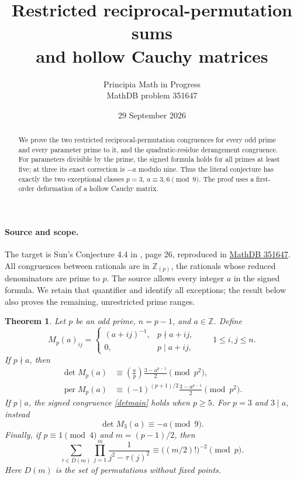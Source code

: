 \documentclass[11pt]{article}
\title{Restricted reciprocal-permutation sums\\
and hollow Cauchy matrices}
\author{Principia Math in Progress\\MathDB problem 351647}
\date{29 September 2026}
\newtheorem{theorem}{Theorem}
\DeclareMathOperator{\per}{per}
\newcommand{\Zp}{\mathbb Z_{(p)}}
\begin{document}
\maketitle
\begin{abstract}
We prove the two restricted reciprocal-permutation congruences for every
odd prime and every parameter prime to it, and the quadratic-residue
derangement congruence. For parameters divisible by the prime, the signed
formula holds for all primes at least five; at three its exact correction
is $-a$ modulo nine. Thus the literal conjecture has exactly the two
exceptional classes $p=3$, $a\equiv3,6\pmod9$. The proof uses a first-order
deformation of a hollow Cauchy matrix.
\end{abstract}

\paragraph{Source and scope.}
The target is Sun's Conjecture 4.4 in \cite{Sun}, page 26, reproduced in
\href{https://mathdb.com/p/351647}{MathDB 351647}. All congruences between
rationals are in $\Zp$, the rationals whose reduced denominators are
prime to $p$. The source allows every integer $a$ in the signed formula.
We retain that quantifier and identify all exceptions; the result below
also proves the remaining, unrestricted prime ranges.

\begin{theorem}\label{main}
Let $p$ be an odd prime, $n=p-1$, and $a\in\mathbb Z$. Define
\[
 M_p(a)_{ij}=
 \begin{cases}(a+ij)^{-1},&p\nmid a+ij,\\0,&p\mid a+ij,\end{cases}
 \qquad 1\leq i,j\leq n .
\]
If $p\nmid a$, then
\begin{align}
 \det M_p(a)&\equiv
 \left(\frac ap\right)\frac{3-a^{p-1}}2\pmod{p^2},\label{detmain}\\
 \per M_p(a)&\equiv
 (-1)^{(p+1)/2}\frac{3-a^{p-1}}2\pmod{p^2}.\label{permain}
\end{align}
If $p\mid a$, the signed congruence \eqref{detmain} holds when $p\geq5$.
For $p=3$ and $3\mid a$, instead
\begin{equation}
 \det M_3(a)\equiv-a\pmod9.\label{exception}
\end{equation}
Finally, if $p\equiv1\pmod4$ and $m=(p-1)/2$, then
\begin{equation}
 \sum_{\tau\in D(m)}
 \prod_{j=1}^m\frac1{j^2-\tau(j)^2}
 \equiv\big((m/2)!\big)^{-2}\pmod p.\label{quadratic}
\end{equation}
Here $D(m)$ is the set of permutations without fixed points.
\end{theorem}
\end{document}
